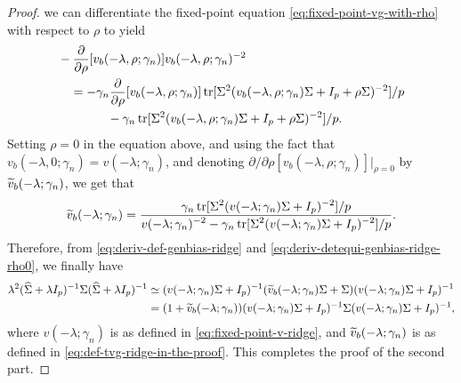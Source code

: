 \documentclass{article}
\begin{document}
\begin{proof}
    we can differentiate the fixed-point equation \eqref{eq:fixed-point-vg-with-rho}
    with respect to $\rho$ to yield
    \begin{equation*}
    \begin{split}
        &-
        \frac{\partial}{\partial \rho}
        [v_b(-\lambda, \rho; \gamma_n)] 
        v_b(-\lambda, \rho; \gamma_n)^{-2} \\
        &\quad = 
        - \gamma_n 
        \frac{\partial}{\partial \rho}[v_b(-\lambda, \rho; \gamma_n)]
        \operatorname{tr}[\Sigma^2 (v_b(-\lambda, \rho; \gamma_n) \Sigma + I_p + \rho \Sigma)^{-2}] / p \\
        &\qquad \qquad - \gamma_n
        \operatorname{tr}[\Sigma^2 (v_b(-\lambda, \rho; \gamma_n) \Sigma + I_p + \rho \Sigma)^{-2}] / p.
    \end{split}
    \end{equation*}
    Setting $\rho = 0$ in the equation above,
    and using the fact that $v_b(-\lambda, 0; \gamma_n) = v(-\lambda; \gamma_n)$,
    and denoting 
    $\partial / \partial \rho[v_b(-\lambda, \rho; \gamma_n)] |_{\rho = 0}$
    by $\widetilde{v}_b(-\lambda; \gamma_n)$,
    we get that
    \begin{equation}
        \label{eq:def-tvg-ridge-in-the-proof}
        \widetilde{v}_b(-\lambda; \gamma_n)
        = 
        \frac{\displaystyle \gamma_n \operatorname{tr}[\Sigma^2 (v(-\lambda; \gamma_n) \Sigma + I_p)^{-2}] / p}{\displaystyle v(-\lambda; \gamma_n)^{-2} - \gamma_n \operatorname{tr}[\Sigma^2 (v(-\lambda; \gamma_n) \Sigma + I_p)^{-2}] / p}.
    \end{equation}
    Therefore, from \eqref{eq:deriv-def-genbias-ridge} 
    and \eqref{eq:deriv-detequi-genbias-ridge-rho0},
    we finally have
   \begin{align*}
        \lambda^2
        ({\widehat{\Sigma}} + \lambda I_p)^{-1}
        \Sigma
        ({\widehat{\Sigma}} + \lambda I_p)^{-1}
        &\simeq
        (v(-\lambda; \gamma_n) \Sigma + I_p)^{-1}
        (\widetilde{v}_b(-\lambda; \gamma_n) \Sigma + \Sigma)
        (v(-\lambda; \gamma_n) \Sigma + I_p)^{-1} \\
        &=
        (1 + \widetilde{v}_b(-\lambda; \gamma_n))
        (v(-\lambda; \gamma_n) \Sigma + I_p)^{-1}
        \Sigma
        (v(-\lambda; \gamma_n) \Sigma + I_p)^{-1},
   \end{align*}
   where $v(-\lambda; \gamma_n)$ is as defined in \eqref{eq:fixed-point-v-ridge},
   and $\widetilde{v}_b(-\lambda; \gamma_n)$ is as defined in \eqref{eq:def-tvg-ridge-in-the-proof}.
   This completes the proof of the second part.
    

\end{proof}
\end{document}
